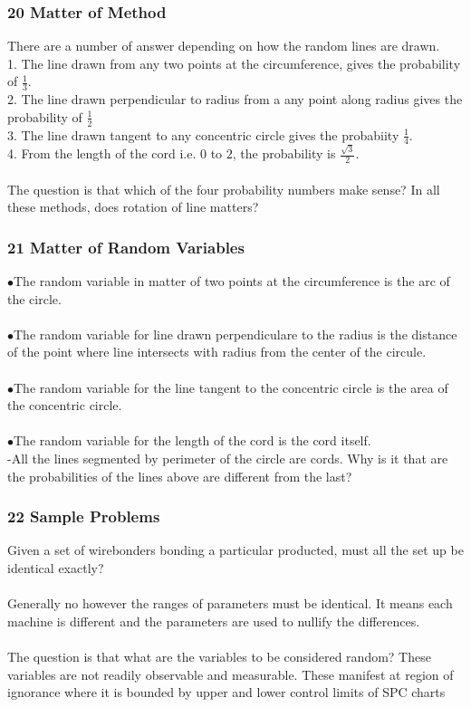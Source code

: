 \documentclass[11pt]{beamer}
\begin{document}
\begin{frame}
\frametitle{20 Matter of Method}
\noindent There are a number of answer depending    on how the random lines are drawn. \\    1. The line drawn from any two points at the circumference, gives the    probability of $\frac{1}{3}$. \\    2. The line drawn perpendicular to radius from a any point along radius gives the    probability of $\frac{1}{2}$ \\    3. The line drawn tangent to any concentric circle gives the probabiity    $\frac{1}{4}$. \\    4. From the length of the cord i.e. $0$ to $2$, the probability is    $\frac{\sqrt{3}}{2}$. \\ \ \\    The question is that which of the four probability numbers make sense?    In all these methods, does rotation of line matters?

\end{frame}

\begin{frame}
\frametitle{21 Matter of Random Variables}
\noindent $\bullet$The random variable in matter of two points at the circumference is the    arc of the circle. \\ \ \\    $\bullet$The random variable for line drawn perpendiculare to the radius is the    distance of the point where line intersects with radius from the center of the circule.    \\ \ \\    $\bullet$The random variable for the line tangent to the concentric circle is the    area of the concentric circle. \\ \ \\    $\bullet$The random variable for the length of the cord is the cord itself. \\    -All the lines segmented by perimeter of the circle are cords. Why is it that    are the probabilities of the lines above are different from the last?

\end{frame}

\begin{frame}
\frametitle{22 Sample Problems}
\noindent Given a set of wirebonders bonding a particular producted, must all the set up     be identical exactly? \\ \ \\     Generally no however the ranges of parameters must be identical. It means     each machine is different and the parameters are used to nullify the     differences. \\ \ \\     The question is that what are the variables to be considered random?     These variables are not readily observable and measurable. These manifest     at region of ignorance where it is bounded by upper and lower control     limits of SPC charts

\end{frame}
\end{document}
